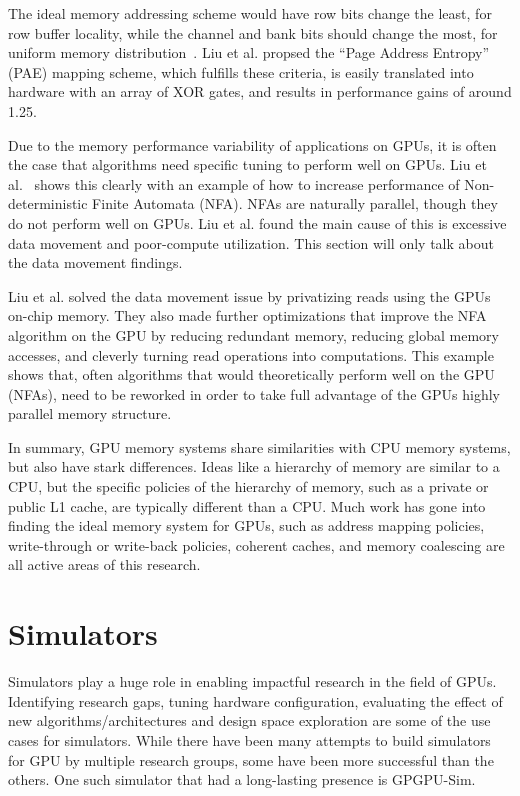 \documentclass[conference]{IEEEtran}
\begin{document}
The ideal memory addressing scheme would have row bits change the least, for row buffer locality, while the channel and bank bits should change the most, for uniform memory distribution~\cite{Liu2018}.
Liu et al. propsed the ``Page Address Entropy'' (PAE) mapping scheme, which fulfills these criteria, is easily translated into hardware with an array of XOR gates, and results in performance gains of around 1.25.

Due to the memory performance variability of applications on GPUs, it is often the case that algorithms need specific tuning to perform well on GPUs.
Liu et al.~\cite{Liu2020} shows this clearly with an example of how to increase performance of Non-deterministic Finite Automata (NFA). NFAs are naturally parallel, though they do not perform well on GPUs. Liu et al. found the main cause of this is excessive data movement and poor-compute utilization. This section will only talk about the data movement findings.

Liu et al. solved the data movement issue by privatizing reads using the GPUs on-chip memory.
They also made further optimizations that improve the NFA algorithm on the GPU by reducing redundant memory, reducing global memory accesses, and cleverly turning read operations into computations.
This example shows that, often algorithms that would theoretically perform well on the GPU (NFAs), need to be reworked in order to take full advantage of the GPUs highly parallel memory structure.

In summary, GPU memory systems share similarities with CPU memory systems, but also have stark differences.
Ideas like a hierarchy of memory are similar to a CPU, but the specific policies of the hierarchy of memory, such as a private or public L1 cache, are typically different than a CPU.
Much work has gone into finding the ideal memory system for GPUs, such as address mapping policies, write-through or write-back policies, coherent caches, and memory coalescing are all active areas of this research.
\section{Simulators}

Simulators play a huge role in enabling impactful research in the field of GPUs.
Identifying research gaps, tuning hardware configuration, evaluating the effect of new algorithms/architectures and design space exploration are some of the use cases for simulators.
While there have been many attempts to build simulators for GPU by multiple research groups, some have been more successful than the others.
One such simulator that had a long-lasting presence is GPGPU-Sim.
\end{document}
